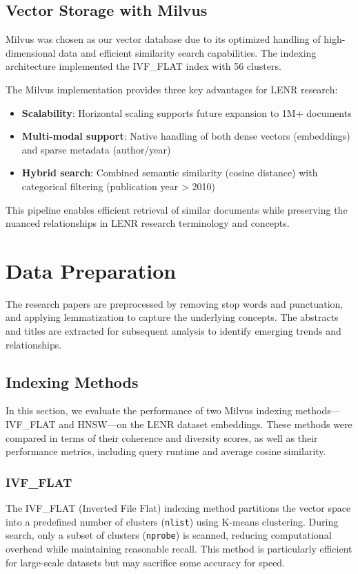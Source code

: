 \documentclass[12pt]{article}
\begin{document}
\subsection{Vector Storage with Milvus}
\label{subsec:milvus}
Milvus was chosen as our vector database due to its optimized handling of high-dimensional data and efficient similarity search capabilities. The indexing architecture implemented the IVF\_FLAT index with 56 clusters.

The Milvus implementation provides three key advantages for LENR research:
\begin{itemize}
    \item \textbf{Scalability}: Horizontal scaling supports future expansion to 1M+ documents
    \item \textbf{Multi-modal support}: Native handling of both dense vectors (embeddings) and sparse metadata (author/year)
    \item \textbf{Hybrid search}: Combined semantic similarity (cosine distance) with categorical filtering (publication year > 2010)
\end{itemize}

This pipeline enables efficient retrieval of similar documents while preserving the nuanced relationships in LENR research terminology and concepts.

\section{Data Preparation}
    The research papers are preprocessed by removing stop words and punctuation, and applying lemmatization to capture the underlying concepts. The abstracts and titles are extracted for subsequent analysis to identify emerging trends and relationships.

    
    \subsection{Indexing Methods}
    In this section, we evaluate the performance of two Milvus indexing methods—IVF\_FLAT and HNSW—on the LENR dataset embeddings. These methods were compared in terms of their coherence and diversity scores, as well as their performance metrics, including query runtime and average cosine similarity.
    
    \subsubsection{IVF\_FLAT}
    The IVF\_FLAT (Inverted File Flat) indexing method partitions the vector space into a predefined number of clusters (\texttt{nlist}) using K-means clustering. During search, only a subset of clusters (\texttt{nprobe}) is scanned, reducing computational overhead while maintaining reasonable recall. This method is particularly efficient for large-scale datasets but may sacrifice some accuracy for speed.
    
\end{document}
